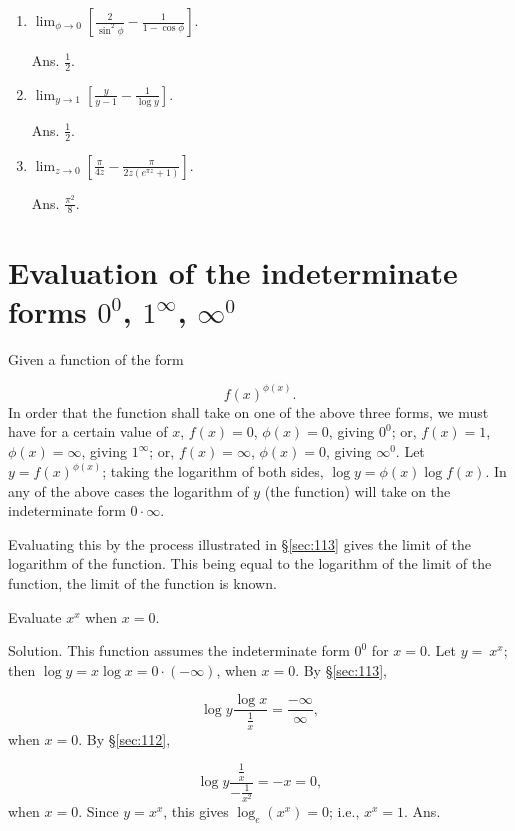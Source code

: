 \begin{enumerate}
\item
$\lim_{\phi \to 0} \left[ \frac{2}{\sin^2 \phi} - \frac{1}{1 - \cos \phi} \right]$.

Ans. $\frac{1}{2}$.

\item
$\lim_{y \to 1} \left[ \frac{y}{y - 1} - \frac{1}{\log y} \right]$. 

Ans. $\frac{1}{2}$.

\item
$\lim_{z \to 0} \left[ \frac{\pi}{4z} - \frac{\pi}{2z(e^{\pi z} + 1)} \right]$. 	

Ans. $\frac{\pi^2}{8}$.

\end{enumerate}


\section{Evaluation of the indeterminate forms $0^0$, $1^{\infty}$, $\infty^0$}
\label{sec:115}

Given a function of the form

\[
  	f(x)^{\phi(x)}.
\]
In order that the function shall take on one of the above three forms, 
we must have for a certain value of $x$,
$f(x) = 0$, $\phi(x) = 0$, giving $0^0$;
or, $f(x) = 1$, $\phi(x) = \infty$, giving $1^{\infty}$;
or, $f(x) = \infty$, $\phi(x) = 0$, giving ${\infty}^0$.
Let 	$y = f(x)^{\phi(x)}$;
taking the logarithm of both sides,
  	$\log y = \phi (x)\log f(x)$.
In any of the above cases the logarithm of $y$ (the function) will take on the 
indeterminate form $0 \cdot \infty$.

Evaluating this by the process illustrated in \S \ref{sec:113} gives 
the limit of the logarithm of the function. This being equal to the 
logarithm of the limit of the function, the limit of the function is known.


\begin{example}
Evaluate $x^x$ when $x = 0$.

Solution. This function assumes the indeterminate form $0^0$ for $x = 0$.
Let $y 	=\ x^x$;
then $\log y 	= x \log x = 0 \cdot (-\infty)$, 	when $x = 0$.
By \S \ref{sec:113}, 

\[
\log y 	\frac{\log x}{\frac{1}{x}} = \frac{-\infty}{\infty}, 	
\]
when $x = 0$.
By \S \ref{sec:112},

\[
\log y 	\frac{\frac{1}{x}}{-\frac{1}{x^2}} = -x = 0,
\]
when $x = 0$.
Since $y = x^x$, this gives $\log_e(x^x) = 0$; i.e., 
$x^x = 1$. Ans.
\end{example}

